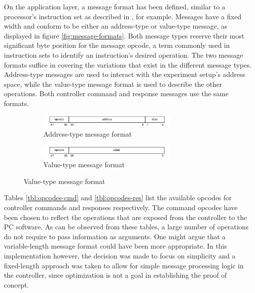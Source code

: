 \documentclass[main.tex]{subfiles}
\begin{document}
On the application layer, a message format has been defined, similar to a processor's instruction set as described in \cite{hennessy2013computer}, for example. Messages have a fixed width and conform to be either an address-type or value-type message, as displayed in figure \ref{fig:message-formats}.  Both message types reserve their most significant byte position for the message opcode, a term commonly used in instruction sets to identify an instruction's desired operation. The two message formats suffice in covering the variations that exist in the different message types. Address-type messages are used to interact with the experiment setup's address space, while the value-type message format is used to describe the other operations. Both controller command and response messages use the same formats. 

\begin{figure}[h]
    \centering
    \caption{Message formats for a controller with an address width of 32 and a data width of 8.}
    \label{fig:message-formats}    \begin{subfigure}[t]{\textwidth}
        \centering
        \caption{Address-type message format}
        \label{fig:message-format-address-typed}
        \includegraphics[width=0.75\textwidth]{img/message-format-address-typed}%
    \end{subfigure}
    \begin{subfigure}[t]{\textwidth}
        \centering
        \caption{Value-type message format}
        \label{fig:message-format-value-typed}
        \includegraphics[width=0.75\textwidth]{img/message-format-value-typed}%
    \end{subfigure}

\end{figure}

Tables \ref{tbl:opcodes-cmd} and \ref{tbl:opcodes-res} list the available opcodes for controller commands and responses respectively. The command opcodes have been chosen to reflect the operations that are exposed from the controller to the PC software. As can be observed from these tables, a large number of operations do not require to pass information as arguments. One might argue that a variable-length message format could have been more appropriate. In this implementation however, the decision was made to focus on simplicity and a fixed-length approach was taken to allow for simple message processing logic in the controller, since optimization is not a goal in establishing the proof of concept.
\end{document}
